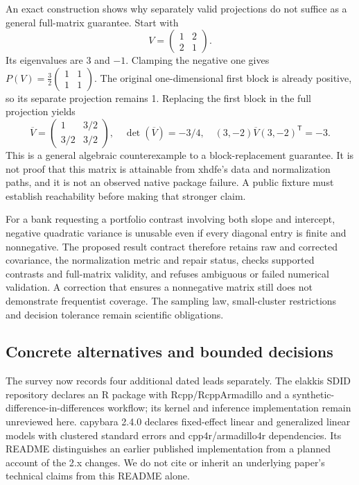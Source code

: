 An exact construction shows why separately valid projections do not suffice
as a general full-matrix guarantee. Start with
\[
V=\begin{pmatrix}1&2\\2&1\end{pmatrix}.
\]
Its eigenvalues are 3 and $-1$. Clamping the negative one gives
$P(V)=\tfrac32\begin{pmatrix}1&1\\1&1\end{pmatrix}$. The original
one-dimensional first block is already positive, so its separate projection
remains 1. Replacing the first block in the full projection yields
\[
\overline V=\begin{pmatrix}1&3/2\\3/2&3/2\end{pmatrix},
\quad\det(\overline V)=-3/4,
\quad (3,-2)\overline V(3,-2)^\mathsf{T}=-3.
\]
This is a general algebraic counterexample to a block-replacement guarantee.
It is not proof that this matrix is attainable from xhdfe's data and
normalization paths, and it is not an observed native package failure.
A public fixture must establish reachability before making that stronger
claim.~\citep{exec25_panelcxx_reference}

For a bank requesting a portfolio contrast involving both slope and
intercept, negative quadratic variance is unusable even if every diagonal
entry is finite and nonnegative. The proposed result contract therefore
retains raw and corrected covariance, the normalization metric and repair
status, checks supported contrasts and full-matrix validity, and refuses
ambiguous or failed numerical validation. A correction that ensures a
nonnegative matrix still does not demonstrate frequentist coverage. The
sampling law, small-cluster restrictions and decision tolerance remain
scientific obligations.~\citep{exec25_panelcxx_reference}

\subsection{Concrete alternatives and bounded decisions}
The survey now records four additional dated leads separately. The elakkis
SDID repository declares an R package with Rcpp/RcppArmadillo and a
synthetic-difference-in-differences workflow; its kernel and inference
implementation remain unreviewed here. capybara 2.4.0 declares fixed-effect
linear and generalized linear models with clustered standard errors and
cpp4r/armadillo4r dependencies. Its README distinguishes an earlier published
implementation from a planned account of the 2.x changes. We do not cite
or inherit an underlying paper's technical claims from this README alone.
\citep{exec25_panelcxx_sdid,exec25_panelcxx_capybara}

